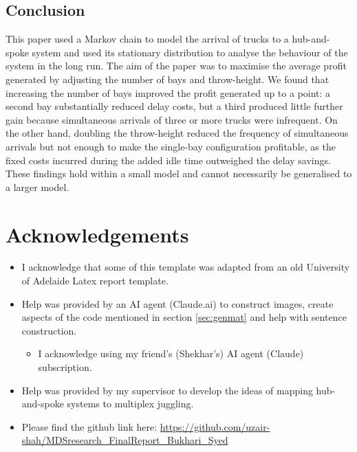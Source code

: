\documentclass{article}
\theoremstyle{definition}
\theoremstyle{remark}
\numberwithin{equation}{section}
\newcommand{\RedComm}[1]{{\color{red}***#1***}}
\begin{document}
\subsection{Conclusion}

This paper used a Markov chain to model the arrival of trucks to a hub-and-spoke system and used its stationary distribution to analyse the behaviour of the system in the long run. The aim of the paper was to maximise the average profit generated by adjusting the number of bays and throw-height. We found that increasing the number of bays improved the profit generated up to a point: a second bay substantially reduced delay costs, but a third produced little further gain because simultaneous arrivals of three or more trucks were infrequent. On the other hand, doubling the throw-height reduced the frequency of simultaneous arrivals but not enough to make the single-bay configuration profitable, as the fixed costs incurred during the added idle time outweighed the delay savings. These findings hold within a small model and cannot necessarily be generalised to a larger model.


\section{Acknowledgements}
\begin{itemize}
\item I acknowledge that some of this template was adapted from an old University of Adelaide
Latex report template.
\item Help was provided by an AI agent (Claude.ai) to construct images, create aspects of the code mentioned in section \ref{sec:genmat} and help with sentence construction.
\begin{itemize}
    \item I acknowledge using my friend's (Shekhar's) AI agent (Claude) subscription. 
\end{itemize}
\item Help was provided by my supervisor to develop the ideas of mapping hub-and-spoke systems to multiplex juggling.
\item Please find the github link here: \url{https://github.com/uzair-shah/MDSresearch_FinalReport_Bukhari_Syed}
\end{itemize}
\end{document}
